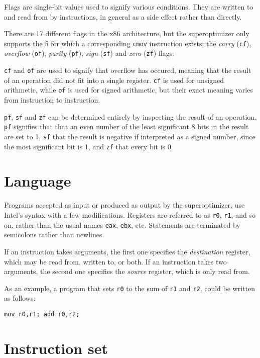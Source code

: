 \documentclass[a4paper,11pt]{kth-mag}
\begin{document}
Flags are single-bit values used to signify various conditions.
They are written to and read from by instructions, in general as a side effect rather than directly.

There are 17 different flags in the x86 architecture, but the superoptimizer only supports the 5 for which a corresponding \verb|cmov| instruction exists:
the \emph{carry} (\verb|cf|), \emph{overflow} (\verb|of|), \emph{parity} (\verb|pf|), \emph{sign} (\verb|sf|) and \emph{zero} (\verb|zf|) flags.

\verb|cf| and \verb|of| are used to signify that overflow has occured, meaning that the result of an operation did not fit into a single register.
\verb|cf| is used for unsigned arithmetic, while \verb|of| is used for signed arithmetic, but their exact meaning varies from instruction to instruction.

\verb|pf|, \verb|sf| and \verb|zf| can be determined entirely by inspecting the result of an operation.
\verb|pf| signifies that that an even number of the least significant 8 bits in the result are set to 1,
\verb|sf| that the result is negative if interpreted as a signed number, since the most significant bit is 1,
and \verb|zf| that every bit is 0.

\section{Language}
\label{s:language}

Programs accepted as input or produced as output by the superoptimizer, use Intel's syntax with a few modifications.
Registers are referred to as \verb|r0|, \verb|r1|, and so on, rather than the usual names \verb|eax|, \verb|ebx|, etc.
Statements are terminated by semicolons rather than newlines.

If an instruction takes arguments, the first one specifies the \emph{destination} register, which may be read from, written to, or both.
If an instruction takes two arguments, the second one specifies the \emph{source} register, which is only read from.

As an example, a program that sets \verb|r0| to the sum of \verb|r1| and \verb|r2|, could be written as follows:

\begin{verbatim}
mov r0,r1; add r0,r2;
\end{verbatim}

\section{Instruction set}
\end{document}
